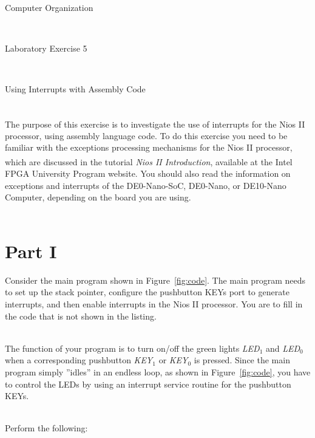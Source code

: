 \documentclass[epsfig,10pt,fullpage]{article}
\newcommand{\LabNum}{5}
\begin{document}
\centerline{\huge Computer Organization}
~\\
\centerline{\huge Laboratory Exercise \LabNum}
~\\
\centerline{\large Using Interrupts with Assembly Code}
~\\

\noindent
The purpose of this exercise is to investigate the use of interrupts for the Nios\textsuperscript{\textregistered} II processor, using assembly language
code. To do this exercise you need to be familiar with the exceptions processing mechanisms
for the Nios II processor, which are discussed in the tutorial {\it Nios II Introduction}, available at the Intel\textsuperscript{\textregistered} FPGA
University Program website. You should also read the information on exceptions and interrupts of the DE0-Nano-SoC, DE0-Nano, or DE10-Nano
Computer, depending on the board you are using.
\noindent
~\\
~\\

\section*{Part I}
Consider the main program shown in Figure~\ref{fig:code}. The main program needs to set up the stack pointer, configure
the pushbutton KEYs port to generate interrupts, and then enable interrupts in the Nios II processor. You
are to fill in the code that is not shown in the listing.  

~\\
\noindent
The function of your program is to turn on/off the green lights {\it LED}$_1$ and {\it LED}$_0$
when a corresponding pushbutton {\it KEY}$_1$ or {\it KEY}$_0$ is pressed. 
Since the main program simply ''idles'' in an endless loop, as
shown in Figure~\ref{fig:code}, you have to control the LEDs by using an 
interrupt service routine for the pushbutton KEYs.

~\\
\noindent
Perform the following:
\end{document}
